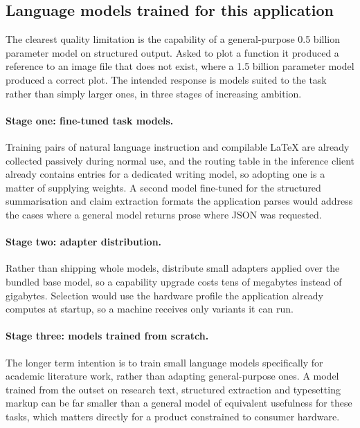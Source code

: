 \documentclass[11pt,a4paper]{article}
\begin{document}
\subsection{Language models trained for this application}

The clearest quality limitation is the capability of a general-purpose 0.5
billion parameter model on structured output. Asked to plot a function it
produced a reference to an image file that does not exist, where a 1.5 billion
parameter model produced a correct plot. The intended response is models suited
to the task rather than simply larger ones, in three stages of increasing
ambition.

\paragraph{Stage one: fine-tuned task models.} Training pairs of natural
language instruction and compilable LaTeX are already collected passively during
normal use, and the routing table in the inference client already contains
entries for a dedicated writing model, so adopting one is a matter of supplying
weights. A second model fine-tuned for the structured summarisation and claim
extraction formats the application parses would address the cases where a
general model returns prose where JSON was requested.

\paragraph{Stage two: adapter distribution.} Rather than shipping whole models,
distribute small adapters applied over the bundled base model, so a capability
upgrade costs tens of megabytes instead of gigabytes. Selection would use the
hardware profile the application already computes at startup, so a machine
receives only variants it can run.

\paragraph{Stage three: models trained from scratch.} The longer term intention
is to train small language models specifically for academic literature work,
rather than adapting general-purpose ones. A model trained from the outset on
research text, structured extraction and typesetting markup can be far smaller
than a general model of equivalent usefulness for these tasks, which matters
directly for a product constrained to consumer hardware.
\end{document}
